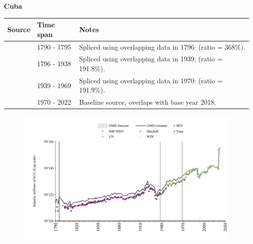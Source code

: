 \documentclass[12pt,a4paper,landscape]{article}
\begin{document}
\begin{adjustbox}{max totalsize={\paperwidth}{\paperheight},center}
\begin{minipage}[t][\textheight][t]{\textwidth}
\vspace*{0.5cm}
{}
\begin{center}
{\Large\bfseries Cuba}
\end{center}
\vspace{0.5cm}
\begin{table}[H]
\centering
\small
\begin{tabular}{|l|l|l|}
\hline
\textbf{Source} & \textbf{Time span} & \textbf{Notes} \\
\hline
\rowcolor{white}\cite{Mitchell}& 1790 - 1795 &Spliced using overlapping data in 1796: (ratio = 368\%).\\
\rowcolor{lightgray}\cite{Tena}& 1796 - 1938 &Spliced using overlapping data in 1939: (ratio = 191.8\%).\\
\rowcolor{white}\cite{Mitchell}& 1939 - 1969 &Spliced using overlapping data in 1970: (ratio = 191.9\%).\\
\rowcolor{lightgray}\cite{WDI}& 1970 - 2022 &Baseline source, overlaps with base year 2018.\\
\hline
\end{tabular}
\end{table}
\begin{figure}[H]
\centering
\includegraphics[width=\textwidth,height=0.6\textheight,keepaspectratio]{graphs/CUB_imports.pdf}
\end{figure}
\end{minipage}
\end{adjustbox}
\end{document}
